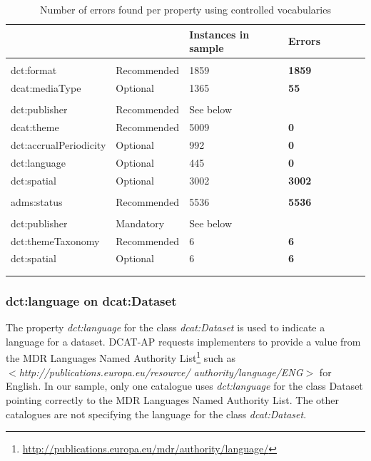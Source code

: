 \documentclass[<options>]{elsarticle}
\begin{document}
\begin{longtable}{*8l}
\rowcolor{white!10}{\textbf{Property}} & {} & {\textbf{Instances in sample}} & {\textbf{Errors}} \\ \hline
\rowcolor{gray!10}{Distribution} & {} & {} & {} \\ \hline
\rowcolor{white!10} dct:format &Recommended &1859 &\textbf{1859} \\ \hline
\rowcolor{white!10} dcat:mediaType &Optional &1365 &\textbf{55} \\ \hline
\rowcolor{gray!10}{Dataset} & {} & {} & {} \\ \hline
\rowcolor{white!10} dct:publisher &Recommended &See below \\ \hline
\rowcolor{white!10} dcat:theme &Recommended &5009 &\textbf{0} \\ \hline
\rowcolor{white!10} dct:accrualPeriodicity &Optional &992 &\textbf{0} \\ \hline
\rowcolor{white!10} dct:language &Optional &445 &\textbf{0} \\ \hline
\rowcolor{white!10} dct:spatial &Optional &3002 &\textbf{3002} \\ \hline
\rowcolor{gray!10}{CatalogRecord} & {} & {} & {} \\ \hline
\rowcolor{white!10} adms:status &Recommended &5536 &\textbf{5536} \\ \hline
\rowcolor{gray!10}{Catalog} & {} & {} & {} \\ \hline
\rowcolor{white!10} dct:publisher &Mandatory &See below\\ \hline
\rowcolor{white!10} dct:themeTaxonomy &Recommended &6 &\textbf{6} \\ \hline
\rowcolor{white!10} dct:spatial &Optional &6 &\textbf{6} \\ \hline
\\
\caption{Number of errors found per property using controlled vocabularies }
\end{longtable}

\subsubsection{dct:language on dcat:Dataset}
The property \textit{dct:language} for the class \textit{dcat:Dataset} is used to indicate a language for a dataset. DCAT-AP requests implementers to provide a value from the MDR Languages Named Authority List\footnote{\href{   http://publications.europa.eu/mdr/authority/language/}{    http://publications.europa.eu/mdr/authority/language/}} such as \\
\textit{$<$http://publications.europa.eu/resource/ authority/language/ENG$>$} for English. In our sample, only one catalogue uses \textit{dct:language} for the class Dataset pointing correctly to the MDR Languages Named Authority List. The other catalogues are not specifying the language for the class \textit{dcat:Dataset}.
\end{document}

